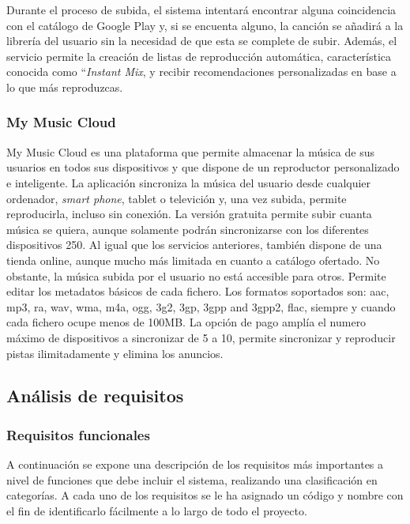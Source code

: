 Durante el proceso de subida, el sistema intentará encontrar alguna coincidencia con el catálogo de Google Play y, si se encuenta alguno, la canción se añadirá a la librería del usuario sin la necesidad de que esta se complete de subir. Además, el servicio permite la creación de listas de reproducción automática, característica conocida como ``\textit{Instant Mix}, y recibir recomendaciones personalizadas en base a lo que más reproduzcas.

\subsubsection{My Music Cloud \cite{MMC}}
My Music Cloud es una plataforma que permite almacenar la música de sus usuarios en todos sus dispositivos y que dispone de un reproductor personalizado e inteligente. La aplicación sincroniza la música del usuario desde cualquier ordenador, \textit{smart phone}, tablet o televición y, una vez subida, permite reproducirla, incluso sin conexión. La versión gratuita permite subir cuanta música se quiera, aunque solamente podrán sincronizarse con los diferentes dispositivos 250. Al igual que los servicios anteriores, también dispone de una tienda online, aunque mucho más limitada en cuanto a catálogo ofertado. No obstante, la música subida por el usuario no está accesible para otros. Permite editar los metadatos básicos de cada fichero. Los formatos soportados son: aac, mp3, ra, wav, wma, m4a, ogg, 3g2, 3gp, 3gpp and 3gpp2, flac, siempre y cuando cada fichero ocupe menos de 100MB. La opción de pago amplía el numero máximo de dispositivos a sincronizar de 5 a 10, permite sincronizar y reproducir pistas ilimitadamente y elimina los anuncios.

\subsection{Análisis de requisitos}

\subsubsection{Requisitos funcionales}
A continuación se expone una descripción de los requisitos más importantes a nivel de funciones que debe incluir el sistema, realizando una clasificación en categorías. A cada uno de los requisitos se le ha asignado un código y nombre con el fin de identificarlo fácilmente a lo largo de todo el proyecto.

